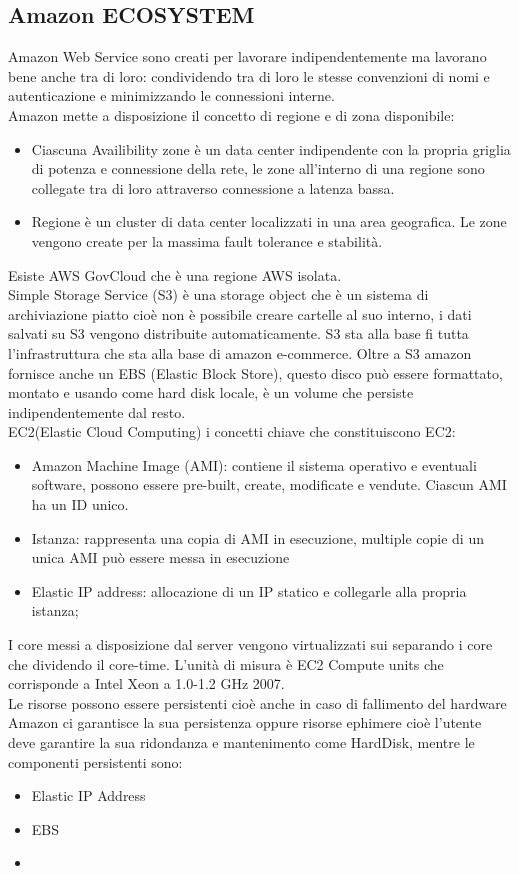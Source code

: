 \documentclass[11pt, twocolumn]{article}
\begin{document}
\subsection{Amazon ECOSYSTEM}
Amazon Web Service sono creati per lavorare indipendentemente ma lavorano bene anche tra di loro: condividendo tra di loro le stesse convenzioni di nomi e autenticazione e minimizzando le connessioni interne.
\\
Amazon mette a disposizione il concetto di regione e di zona disponibile:
\begin{itemize}
	\item Ciascuna Availibility zone è un data center indipendente con la propria griglia di potenza e connessione della rete, le zone all'interno di una regione sono collegate tra di loro attraverso connessione a latenza bassa.
	\item Regione è un cluster di data center localizzati in una area geografica. 
	Le zone vengono create per la massima fault tolerance e stabilità.
\end{itemize}
Esiste AWS GovCloud che è una regione AWS isolata.\\
Simple Storage Service (S3) è una storage object che è un sistema di archiviazione piatto cioè non è possibile creare cartelle al suo interno, i dati salvati su S3 vengono distribuite automaticamente. 
S3 sta alla base fi tutta l'infrastruttura che sta alla base di amazon e-commerce.
Oltre a S3 amazon fornisce anche un EBS (Elastic Block Store), questo disco può essere formattato, montato e usando come hard disk locale, è un volume che persiste indipendentemente dal resto.\\

EC2(Elastic Cloud Computing)
i concetti chiave che constituiscono EC2:
\begin{itemize}
	\item Amazon Machine Image (AMI):
	contiene il sistema operativo e eventuali software, possono essere pre-built, create, modificate e vendute. Ciascun AMI ha un ID unico.
	\item Istanza: rappresenta una copia di AMI in esecuzione, multiple copie di un unica AMI può essere messa in esecuzione
	\item Elastic IP address: allocazione di un IP statico e collegarle alla propria istanza; 
\end{itemize}
I core messi a disposizione dal server vengono virtualizzati sui separando i core che dividendo il core-time. L'unità di misura è EC2 Compute units che corrisponde a Intel Xeon a 1.0-1.2 GHz 2007.\\
Le risorse possono essere persistenti cioè anche in caso di fallimento del hardware Amazon ci garantisce la sua persistenza oppure risorse ephimere cioè l'utente deve garantire la sua ridondanza e mantenimento come HardDisk, mentre le componenti persistenti sono:
\begin{itemize}
	\item Elastic IP Address
	\item EBS
	\item 
\end{itemize}
\end{document}
